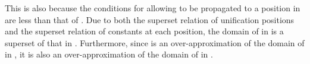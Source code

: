 This is also because the conditions for allowing \code{\alpha} to be propagated to a position in \code{\drule} 
are less than that of 
.
Due to both the superset relation of unification positions and the superset relation of constants at each position, the domain of \code{\alpha} in  is a superset of that in \code{\drule^{*}}. Furthermore, since  is an over-approximation of the domain of \code{\alpha} in , it is also an over-approximation of the domain of \code{\alpha} in \code{\drule^{*}}.


